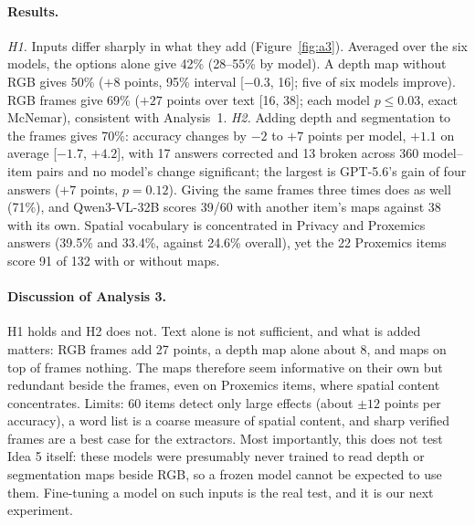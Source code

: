 \paragraph{Results.} \emph{H1.} Inputs differ sharply in what they add (Figure~\ref{fig:a3}). Averaged over the six models, the options alone give 42\% (28--55\% by model). A depth map without RGB gives 50\% ($+8$ points, 95\% interval [$-0.3$, 16]; five of six models improve). RGB frames give 69\% ($+27$ points over text [16, 38]; each model $p\le0.03$, exact McNemar), consistent with Analysis~1. \emph{H2.} Adding depth and segmentation to the frames gives 70\%: accuracy changes by $-2$ to $+7$ points per model, $+1.1$ on average [$-1.7$, $+4.2$], with 17 answers corrected and 13 broken across 360 model--item pairs and no model's change significant; the largest is GPT-5.6's gain of four answers ($+7$ points, $p=0.12$). Giving the same frames three times does as well (71\%), and Qwen3-VL-32B scores 39/60 with another item's maps against 38 with its own. Spatial vocabulary is concentrated in Privacy and Proxemics answers (39.5\% and 33.4\%, against 24.6\% overall), yet the 22 Proxemics items score 91 of 132 with or without maps.

\paragraph{Discussion of Analysis 3.} H1 holds and H2 does not. Text alone is not sufficient, and what is added matters: RGB frames add 27 points, a depth map alone about 8, and maps on top of frames nothing. The maps therefore seem informative on their own but redundant beside the frames, even on Proxemics items, where spatial content concentrates. Limits: 60 items detect only large effects (about $\pm12$ points per accuracy), a word list is a coarse measure of spatial content, and sharp verified frames are a best case for the extractors. Most importantly, this does not test Idea 5 itself: these models were presumably never trained to read depth or segmentation maps beside RGB, so a frozen model cannot be expected to use them. Fine-tuning a model on such inputs is the real test, and it is our next experiment.
